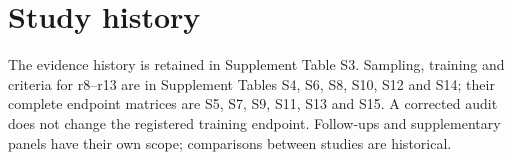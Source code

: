 \section{Study history}\label{app:history}

The evidence history is retained in Supplement Table S3. Sampling, training and
criteria for r8--r13 are in Supplement Tables S4, S6, S8, S10, S12 and S14;
their complete endpoint matrices are S5, S7, S9, S11, S13 and S15. A corrected
audit does not change the registered training endpoint. Follow-ups and supplementary
panels have their own scope; comparisons between studies are historical.
